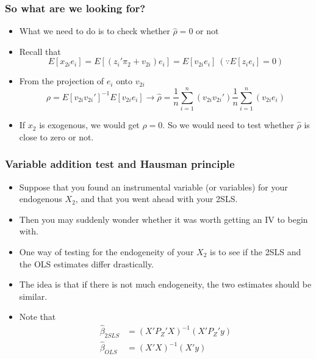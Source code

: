 \documentclass[aspectratio=169]{beamer}
\begin{document}
\begin{frame}
\frametitle{So what are we looking for?}
\begin{itemize}
\item What we need to do is to check whether $\hat{\rho}=0$ or not
\item Recall that
\[
E[x_{2i}e_i]=E[(z_i'\pi_2 + v_{2i})e_i]=E[v_{2i}e_i] \ (\because E[z_ie_i]=0)
\]
\item From the projection of $e_i$ onto $v_{2i}$
\[
\rho = E[v_{2i}v_{2i}']^{-1}E[v_{2i}e_i]\to\hat{\rho}=\frac{1}{n}\sum_{i=1}^n(v_{2i}v_{2i}') \frac{1}{n}\sum_{i=1}^n(v_{2i}e_i)
\]
\item If $x_2$ is exogenous, we would get $\rho=0$. So we would need to test whether $\hat{\rho}$ is close to zero or not. 
\end{itemize}
\end{frame}

\begin{frame}
\frametitle{Variable addition test and Hausman principle}
\begin{itemize}
\item Suppose that you found an instrumental variable (or variables) for your endogenous $X_2$, and that you went ahead with your 2SLS. 
\item Then you may suddenly wonder whether it was worth getting an IV to begin with. 
\item One way of testing for the endogeneity of your $X_2$ is to see if the 2SLS and the OLS estimates differ drastically.
\item The idea is that if there is not much endogeneity, the two estimates should be similar.
\item Note that
\[
\begin{aligned}
\hat{\beta}_{2SLS}&=(X'P_Z'X)^{-1}(X'P_Z'y)\\
\hat{\beta}_{OLS}&=(X'X)^{-1}(X'y)\\
\end{aligned}
\]
\end{itemize}
\end{frame}
\end{document}
